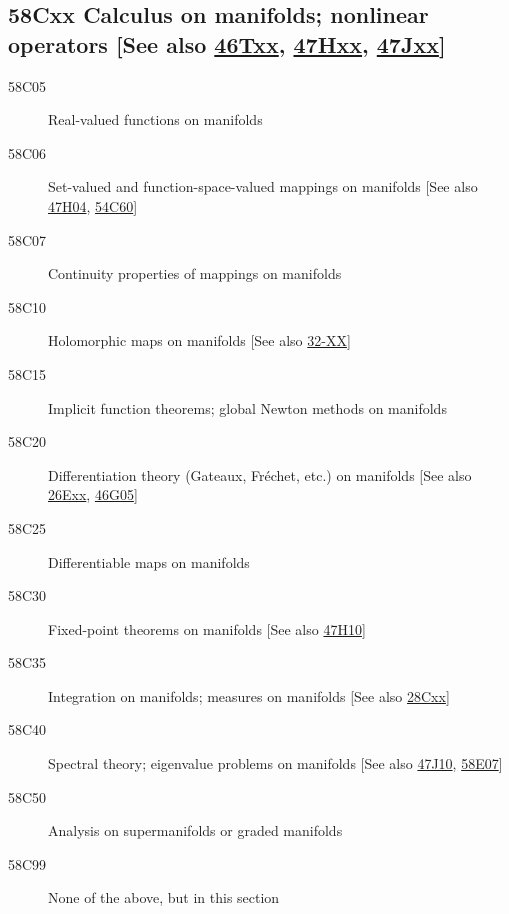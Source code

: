 \documentclass[letterpaper]{article}
\begin{document}
\subsection*{58Cxx  Calculus on manifolds; nonlinear operators [See also \hyperref[46Txx]{46Txx}, \hyperref[47Hxx]{47Hxx}, \hyperref[47Jxx]{47Jxx}]}\label{58Cxx}
\begin{description}  
\item [58C05]\label{58C05} Real-valued functions on manifolds
\item [58C06]\label{58C06} Set-valued and function-space-valued mappings on manifolds [See also \hyperref[47H04]{47H04}, \hyperref[54C60]{54C60}]
\item [58C07]\label{58C07} Continuity properties of mappings on manifolds
\item [58C10]\label{58C10} Holomorphic maps on manifolds [See also \hyperref[32-XX]{32-XX}]
\item [58C15]\label{58C15} Implicit function theorems; global Newton methods on manifolds
\item [58C20]\label{58C20} Differentiation theory (Gateaux, Fr\'{e}chet, etc.) on manifolds [See also \hyperref[26Exx]{26Exx}, \hyperref[46G05]{46G05}]
\item [58C25]\label{58C25} Differentiable maps on manifolds
\item [58C30]\label{58C30} Fixed-point theorems on manifolds [See also \hyperref[47H10]{47H10}]
\item [58C35]\label{58C35} Integration on manifolds; measures on manifolds [See also \hyperref[28Cxx]{28Cxx}]
\item [58C40]\label{58C40} Spectral theory; eigenvalue problems  on manifolds [See also \hyperref[47J10]{47J10}, \hyperref[58E07]{58E07}]
\item [58C50]\label{58C50} Analysis on supermanifolds or graded manifolds
\item [58C99]\label{58C99} None of the above, but in this section
\end{description}
\end{document}
